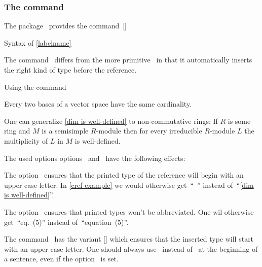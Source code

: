 \subsubsection{The command~}

The package~ provides the command~[\comname]
\begin{showcode}{Syntax of }
\cref{labelname}
\end{showcode}
The command~ differs from the more primitive~ in that it automatically inserts the right kind of type before the reference.
\begin{showlatex}{Using the command~}
\begin{lemma}
  \label{dim is well-defined}
  Every two bases of a vector space have the same cardinality.
\end{lemma}

\begin{remark}
  One can generalize \cref{dim is well-defined} to non-commutative rings:
  If $R$ is some ring and $M$ is a semisimple $R$-module then for every irreducible $R$-module $L$ the multiplicity of $L$ in $M$ is well-defined.
\end{remark}
\end{showlatex}

The used options options~ and~ have the following effects:
\begin{myitemize}
  \item
    The option~ ensures that the printed type of the reference will begin with an upper case letter.
    In \cref{cref example} we would otherwise get~\enquote{~} instead of~\enquote{\cref{dim is well-defined}}.
  \item
    The option~ ensures that printed types won’t be abbreviated.
    One wil otherwise get~\enquote{eq.\ (5)} instead of~\enquote{equation~(5)}.
\end{myitemize}

The command~ has the variant [\comname] which ensures that the inserted type will start with an upper case letter.
One should always use~ instead of~ at the beginning of a sentence, even if the option~ is set.

